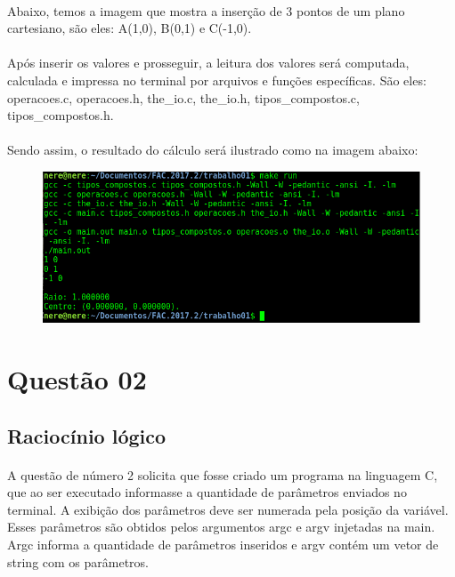 \documentclass[a4paper, 12pt]{article}
\begin{document}
        \paragraph{}	Abaixo, temos a imagem que mostra a inser\c{c}\~ao de 3 pontos de um plano cartesiano, s\~ao eles: A(1,0), B(0,1) e C(-1,0). 
        \paragraph{}	Ap\'os inserir os valores e prosseguir, a leitura dos valores ser\'a computada, calculada e impressa no terminal por arquivos e fun\c{c}\~oes espec\'ificas. S\~ao eles: operacoes.c, operacoes.h, the\_io.c, the\_io.h, tipos\_compostos.c, tipos\_compostos.h. 
        \paragraph{}	Sendo assim, o resultado do c\'alculo ser\'a ilustrado como na imagem abaixo:
        \begin{figure}[H]
        	\centering
			\includegraphics[scale=0.5]{img1.png}
		\end{figure}
\section{Quest\~ao 02}
    \subsection{Racioc\'inio l\'ogico}
        \paragraph{}    A quest\~ao de n\'umero 2 solicita que fosse criado um programa na linguagem C, que ao ser executado informasse a quantidade de par\^ametros enviados no terminal. A exibi\c{c}\~ao dos par\^ametros deve ser numerada pela posi\c{c}\~ao da vari\'avel. Esses par\^ametros s\~ao obtidos pelos argumentos argc e argv injetadas na main. Argc informa a quantidade de par\^ametros inseridos e argv cont\'em um vetor de string com os par\^ametros.
\end{document}
